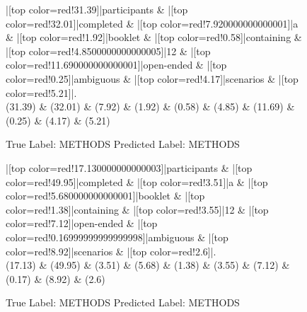 \documentclass[a4paper, landscape]{article}
\begin{document}
\clearpage
\begin{figure}
\begin{center}
\begin{dependency}
\begin{deptext}
|[top color=red!31.39]|participants \& |[top color=red!32.01]|completed \& |[top color=red!7.920000000000001]|a \& |[top color=red!1.92]|booklet \& |[top color=red!0.58]|containing \& |[top color=red!4.8500000000000005]|12 \& |[top color=red!11.690000000000001]|open-ended \& |[top color=red!0.25]|ambiguous \& |[top color=red!4.17]|scenarios \& |[top color=red!5.21]|.\\
(31.39) \& (32.01) \& (7.92) \& (1.92) \& (0.58) \& (4.85) \& (11.69) \& (0.25) \& (4.17) \& (5.21)\\
\end{deptext}
\end{dependency}
\end{center}
\caption{True Label: METHODS Predicted Label: METHODS}
\end{figure}
\clearpage
\begin{figure}
\begin{center}
\begin{dependency}
\begin{deptext}
|[top color=red!17.130000000000003]|participants \& |[top color=red!49.95]|completed \& |[top color=red!3.51]|a \& |[top color=red!5.680000000000001]|booklet \& |[top color=red!1.38]|containing \& |[top color=red!3.55]|12 \& |[top color=red!7.12]|open-ended \& |[top color=red!0.16999999999999998]|ambiguous \& |[top color=red!8.92]|scenarios \& |[top color=red!2.6]|.\\
(17.13) \& (49.95) \& (3.51) \& (5.68) \& (1.38) \& (3.55) \& (7.12) \& (0.17) \& (8.92) \& (2.6)\\
\end{deptext}
\end{dependency}
\end{center}
\caption{True Label: METHODS Predicted Label: METHODS}
\end{figure}
\end{document}
